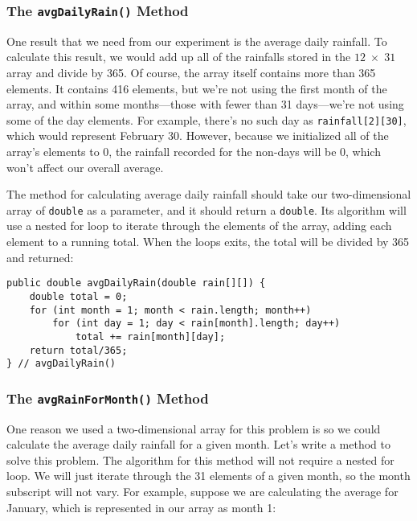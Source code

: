 \subsubsection*{The {\tt avgDailyRain()} Method}
\noindent One result that we need from our experiment is the average daily 
rainfall.  To calculate this result, we would add up all of the
rainfalls stored in the $12 \;\times\; 31$ array and divide by 365.
Of course, the array itself contains more than 365 elements.   It
contains 416 elements,  but we're not using the first month of the
array, and within some months---those with fewer than 31 days---we're not using some of 
the day elements.   For example, there's no
such day as {\tt rainfall[2][30]}, which would represent February 30.
However, because we initialized all of the array's elements to 0, the
rainfall recorded for the non-days will be 0, which won't affect our
overall average.

The method for calculating average daily rainfall should take
our two-dimensional array of \mbox{\tt double} as a parameter, and it
should return a \mbox{\tt double}. Its algorithm will use a nested
for loop to iterate through the elements of the array, adding
each element to a running total.  When the loops exits, the
total will be divided by 365 and returned:

\begin{jjjlisting}
\begin{lstlisting}
public double avgDailyRain(double rain[][]) {
    double total = 0;
    for (int month = 1; month < rain.length; month++)
        for (int day = 1; day < rain[month].length; day++)
            total += rain[month][day];
    return total/365;
} // avgDailyRain()
\end{lstlisting}
\end{jjjlisting}

\subsubsection*{The {\tt avgRainForMonth()} Method}
\noindent One reason we used a two-dimensional array for this problem is so we
could calculate the average daily rainfall for a given month.  Let's
write a method to solve this problem.  The algorithm for this method
will not require a nested for loop. We will just iterate
through the 31 elements of a given month, so the month subscript
will not vary.  For example, suppose we are calculating the average
for January, which is represented in our array as month 1:

